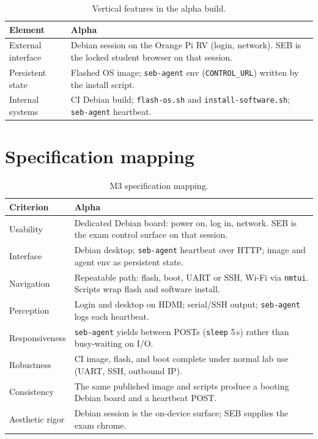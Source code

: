 \documentclass[11pt]{article}
\begin{document}
\begin{table}[H]
  \centering
  \footnotesize
  \setlength{\tabcolsep}{3pt}
  \begin{tabularx}{\textwidth}{@{}p{}X@{}}
    \toprule
    \textbf{Element} & \textbf{Alpha} \\
    \midrule
    External interface &
    Debian session on the Orange Pi RV (login, network). SEB is the locked student browser on that session. \\
    Persistent state &
    Flashed OS image; \texttt{seb-agent} env (\texttt{CONTROL\_URL}) written by the install script. \\
    Internal systems &
    CI Debian build; \texttt{flash-os.sh} and \texttt{install-software.sh}; \texttt{seb-agent} heartbeat. \\
    \bottomrule
  \end{tabularx}
  \caption{Vertical features in the alpha build.}
  \label{tab:vertical}
\end{table}

\section{Specification mapping}

\begin{table}[H]
  \centering
  \small
  \setlength{\tabcolsep}{6pt}
  \begin{tabularx}{\textwidth}{@{}l >{\raggedright\arraybackslash}X@{}}
    \toprule
    \textbf{Criterion} & \textbf{Alpha} \\
    \midrule
    Usability &
    Dedicated Debian board: power on, log in, network. SEB is the exam control surface on that session. \\
    Interface &
    Debian desktop; \texttt{seb-agent} heartbeat over HTTP; image and agent env as persistent state. \\
    Navigation &
    Repeatable path: flash, boot, UART or SSH, Wi-Fi via \texttt{nmtui}. Scripts wrap flash and software install. \\
    Perception &
    Login and desktop on HDMI; serial/SSH output; \texttt{seb-agent} logs each heartbeat. \\
    Responsiveness &
    \texttt{seb-agent} yields between POSTs (\texttt{sleep} 5\,s) rather than busy-waiting on I/O. \\
    Robustness &
    CI image, flash, and boot complete under normal lab use (UART, SSH, outbound IP). \\
    Consistency &
    The same published image and scripts produce a booting Debian board and a heartbeat POST. \\
    Aesthetic rigor &
    Debian session is the on-device surface; SEB supplies the exam chrome. \\
    \bottomrule
  \end{tabularx}
  \caption{M3 specification mapping.}
  \label{tab:rubric}
\end{table}
\end{document}
